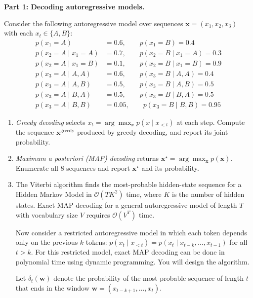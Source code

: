 \documentclass[submit]{../harvardml}
\begin{document}
\begin{framed}
\noindent \textbf{Part 1: Decoding autoregressive models.}

\noindent Consider the following autoregressive model over sequences $\mathbf{x} = (x_1, x_2, x_3)$ with each $x_t \in \{A, B\}$:
\begin{align*}
  p(x_1 = A) &= 0.6, \qquad p(x_1 = B) = 0.4 \\
  p(x_2 = A \mid x_1 = A) &= 0.7, \qquad p(x_2 = B \mid x_1 = A) = 0.3 \\
  p(x_2 = A \mid x_1 = B) &= 0.1, \qquad p(x_2 = B \mid x_1 = B) = 0.9 \\
  p(x_3 = A \mid A, A) &= 0.6, \qquad p(x_3 = B \mid A, A) = 0.4 \\
  p(x_3 = A \mid A, B) &= 0.5, \qquad p(x_3 = B \mid A, B) = 0.5 \\
  p(x_3 = A \mid B, A) &= 0.5, \qquad p(x_3 = B \mid B, A) = 0.5 \\
  p(x_3 = A \mid B, B) &= 0.05, \qquad p(x_3 = B \mid B, B) = 0.95
\end{align*}

\begin{enumerate}
  \item[1a.] \emph{Greedy decoding} selects $x_t = \arg\max_{x} p(x \mid x_{<t})$ at each step. Compute the sequence $\mathbf{x}^{\text{greedy}}$ produced by greedy decoding, and report its joint probability.
  
  \item[1b.] \emph{Maximum a posteriori (MAP) decoding} returns $\mathbf{x}^{\star} = \arg\max_{\mathbf{x}} p(\mathbf{x})$. Enumerate all 8 sequences and report $\mathbf{x}^{\star}$ and its probability.
  
  \item[1c.] The Viterbi algorithm finds the most-probable hidden-state sequence for a Hidden Markov Model in $\mathcal{O}(TK^2)$ time, where $K$ is the number of hidden states. Exact MAP decoding for a general autoregressive model of length $T$ with vocabulary size $V$ requires $\mathcal{O}(V^T)$ time.

  Now consider a restricted autoregressive model in which each token depends only on the previous $k$ tokens: $p(x_t \mid x_{<t}) = p(x_t \mid x_{t-k}, \ldots, x_{t-1})$ for all $t > k$. For this restricted model, exact MAP decoding can be done in polynomial time using dynamic programming. You will design the algorithm.

  Let $\delta_t(\mathbf{w})$ denote the probability of the most-probable sequence of length $t$ that ends in the window $\mathbf{w} = (x_{t-k+1}, \ldots, x_t)$.
  

\end{enumerate}
\end{framed}
\end{document}
